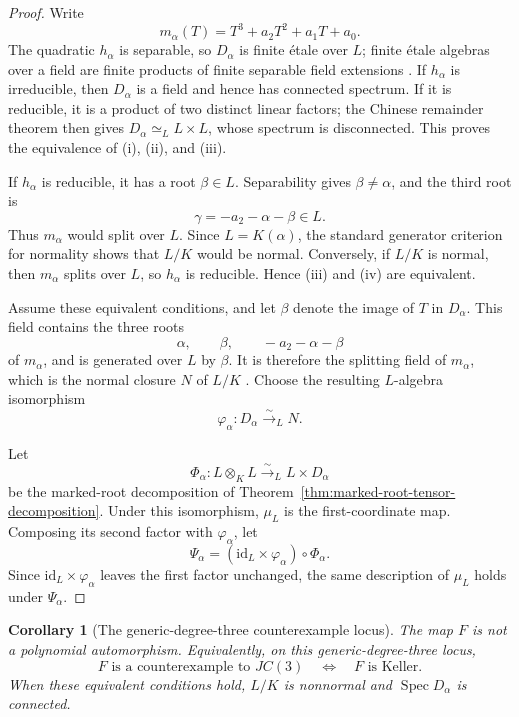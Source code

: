\documentclass[11pt]{article}
\newtheorem{corollary}[theorem]{Corollary}
\theoremstyle{remark}
\DeclareMathOperator{\Spec}{Spec}
\newcommand{\id}{\mathrm{id}}
\begin{document}
\begin{proof}
Write
\[
  m_\alpha(T)=T^3+a_2T^2+a_1T+a_0.
\]
The quadratic \(h_\alpha\) is separable, so \(D_\alpha\) is finite
\'etale over \(L\); finite \'etale algebras over a field are finite
products of finite separable field extensions
\cite{StacksEtaleAlgebrasField}.
If \(h_\alpha\) is irreducible, then
\(D_\alpha\) is a field and hence has connected spectrum.  If it is
reducible, it is a product of two distinct linear factors; the Chinese
remainder theorem then gives \(D_\alpha\simeq_L L\times L\), whose spectrum
is disconnected.  This proves the equivalence of \textup{(i)},
\textup{(ii)}, and \textup{(iii)}.

If \(h_\alpha\) is reducible, it has a root \(\beta\in L\).
Separability gives \(\beta\neq\alpha\), and the third root is
\[
  \gamma=-a_2-\alpha-\beta\in L.
\]
Thus \(m_\alpha\) would split over \(L\).  Since
\(L=K(\alpha)\), the standard generator criterion for normality
\cite{StacksNormalGeneratorCriterion}
shows that \(L/K\) would be normal.  Conversely,
if \(L/K\) is normal, then \(m_\alpha\) splits over \(L\), so
\(h_\alpha\) is reducible.  Hence \textup{(iii)} and \textup{(iv)} are
equivalent.

Assume these equivalent conditions, and let \(\beta\) denote the image of
\(T\) in \(D_\alpha\).  This field contains the three roots
\[
  \alpha,\qquad \beta,\qquad -a_2-\alpha-\beta
\]
of \(m_\alpha\), and is generated over \(L\) by \(\beta\).  It is
therefore the splitting field of \(m_\alpha\), which is the normal
closure \(N\) of \(L/K\)
\cite{StacksNormalClosureExistence}.
Choose the resulting \(L\)-algebra
isomorphism
\[
  \varphi_\alpha\colon D_\alpha\xrightarrow{\sim}_L N.
\]

Let
\[
  \Phi_\alpha\colon
  L\otimes_KL
  \xrightarrow{\sim}_L
  L\times D_\alpha
\]
be the marked-root decomposition of
Theorem~\ref{thm:marked-root-tensor-decomposition}.  Under this
isomorphism, \(\mu_L\) is the first-coordinate map.
Composing its second factor with \(\varphi_\alpha\), let
\[
  \Psi_\alpha=(\id_L\times\varphi_\alpha)\circ\Phi_\alpha.
\]
Since \(\id_L\times\varphi_\alpha\) leaves the first factor unchanged,
the same description of \(\mu_L\) holds under \(\Psi_\alpha\).
\end{proof}

\begin{corollary}[The generic-degree-three counterexample locus]
\label{cor:cubic-counterexample-locus}
The map \(F\) is not a polynomial automorphism.  Equivalently, on this
generic-degree-three locus,
\[
  F\text{ is a counterexample to }JC(3)
  \quad\Longleftrightarrow\quad
  F\text{ is Keller}.
\]
When these equivalent conditions hold, \(L/K\) is nonnormal and
\(\Spec D_\alpha\) is connected.
\end{corollary}
\end{document}
